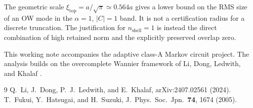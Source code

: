 \documentclass[aps,prb,onecolumn,nofootinbib,superscriptaddress]{revtex4-2}
\begin{document}
The geometric scale $\xi_{\mathrm{top}}=a/\sqrt{\pi}\simeq0.564a$ gives a lower bound on the RMS size of an OW mode in the \(\alpha=1\), \(|C|=1\) band.  It is not a certification radius for a discrete truncation.  The justification for $n_{\mathrm{shell}}=1$ is instead the direct combination of high retained norm and the explicitly preserved overlap zero.

\begin{acknowledgments}
This working note accompanies the adaptive class-A Markov circuit project. The analysis builds on the overcomplete Wannier framework of Li, Dong, Ledwith, and Khalaf \cite{Li2024}.
\end{acknowledgments}

\begin{thebibliography}{9}
 Q.~Li, J.~Dong, P.~J.~Ledwith, and E.~Khalaf, arXiv:2407.02561 (2024).
 T.~Fukui, Y.~Hatsugai, and H.~Suzuki, J.~Phys.~Soc.~Jpn.~\textbf{74}, 1674 (2005).
\end{thebibliography}
\end{document}
